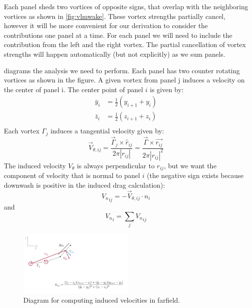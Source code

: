 \documentclass{article}
\begin{document}
Each panel sheds two vortices of opposite signs, that overlap with the neighboring vortices as shown in \cref{fig:vlmwake}.  These vortex strengths partially cancel, however it will be more convenient for our derivation to consider the contributions one panel at a time.  For each panel we will need to include the contribution from the left and the right vortex.  The partial cancellation of vortex strengths will happen automatically (but not explicitly) as we sum panels.  


 diagrams the analysis we need to perform.  Each panel has two counter rotating vortices as shown in the figure.  A given vortex from panel j induces a velocity on the center of  panel i. The center point of panel $i$ is given by:
\begin{align}
\bar{y}_i &= \frac{1}{2} (y_{i+1} + y_i)\\
\bar{z}_i &= \frac{1}{2} (z_{i+1} + z_i)\\
\end{align}
Each vortex $\Gamma_j$ induces a tangential velocity given by:
\begin{equation}
\vec{V}_{\theta, ij} = \frac{\vec\Gamma_j \times \hat{r}_{ij}}{2 \pi |r_{ij}|} = \frac{\vec\Gamma \times \vec{r_{ij}}}{2 \pi |r_{ij}|^2}
\end{equation}
The induced velocity $V_\theta$ is always perpendicular to $r_{ij}$, but we want the component of velocity that is normal to panel $i$ (the negative sign exists because downwash is positive in the induced drag calculation):
\begin{equation}
{V_n}_{ij} = -\vec{V}_{\theta, ij} \cdot \hat{n}_i
\end{equation}
and
\begin{equation}
    {V_n}_{i} = \sum_j {V_n}_{ij}
\end{equation}

\begin{figure}[htbp]
\centering
\includegraphics[width=2.25in]{figs/induced}
\caption{Diagram for computing induced velocities in farfield.}
\label{fig:induced}
\end{figure}
\end{document}
